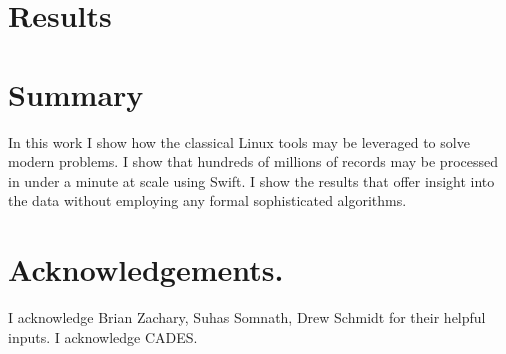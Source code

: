 \documentclass{article}
\begin{document}
\section*{Results}

\section*{Summary}
In this work I show how the classical Linux tools may be leveraged to solve
modern problems. I show that hundreds of millions of records may be processed
in under a minute at scale using Swift. I show the results that offer insight
into the data without employing any formal sophisticated algorithms.

\section*{Acknowledgements.}
I acknowledge Brian Zachary, Suhas Somnath, Drew Schmidt for their helpful
inputs. I acknowledge CADES.
\end{document}
